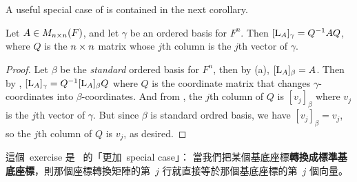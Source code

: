 A useful special case of  is contained in the next corollary.

\begin{corollary} \label{corollary 2.23.1}
Let \(A \in M_{n \times n}(F)\), and let \(\gamma\) be an ordered basis for \(F^n\).
Then \([\mathrm{L}_A]_{\gamma} = Q^{-1} A Q\), where \(Q\) is the \(n \times n\) matrix whose \(j\)th column is the \(j\)th vector of \(\gamma\).
\end{corollary}

\begin{proof}
Let \(\beta\) be the \emph{standard} ordered basis for \(F^n\), then by (a), \([\mathrm{L}_A]_{\beta} = A\).
Then by , \([\mathrm{L}_A]_{\gamma} = Q^{-1} [\mathrm{L}_A]_{\beta} Q\) where \(Q\) is the coordinate matrix that changes \(\gamma\)-coordinates into \(\beta\)-coordinates.
And from , the \(j\)th column of \(Q\) is \([v_j]_{\beta}\) where \(v_j\) is the \(j\)th vector of \(\gamma\).
But since \(\beta\) is standard ordred basis, we have \([v_j]_{\beta} = v_j\), so the \(j\)th column of \(Q\) is \(v_j\), as desired.
\end{proof}

\begin{note}
這個\ exercise 是\  的「更加\ special case」：
當我們把某個基底座標\textbf{轉換成標準基底座標}，則那個座標轉換矩陣的第\ \(j\) 行就直接等於那個基底座標的第\ \(j\) 個向量。
\end{note}

